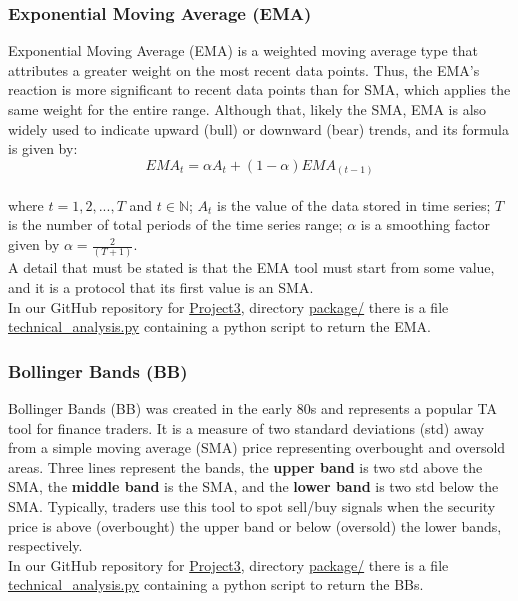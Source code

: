 \subsubsection{Exponential Moving Average (EMA)}
\label{chap:Exponential Moving Average (EMA)}

\quad Exponential Moving Average (EMA) is a weighted moving average type that attributes a greater weight on the most recent data points. Thus, the EMA's reaction is more significant to recent data points than for SMA, which applies the same weight for the entire range. Although that, likely the SMA, EMA is also widely used to indicate upward (bull) or downward (bear) trends, and its formula is given by:\\

$${EMA}_t = \alpha A_t + (1 - \alpha) EMA_{(t-1)}$$\\

\noindent where $t = 1, 2, ..., T$ and $t \in \mathbb{N}$; $A_t$ is the value of the data stored in time series; $T$ is the number of total periods of the time series range; $\alpha$ is a smoothing factor given by $\alpha = \frac{2}{(T+1)}$.\\

A detail that must be stated is that the EMA tool must start from some value, and it is a protocol that its first value is an SMA.\\

In our GitHub repository for \href{https://github.com/fabiorodp/UiO-FYS-STK4155/tree/master/Project3}{Project3}, directory \href{https://github.com/fabiorodp/UiO-FYS-STK4155/tree/master/Project3/package/}{package/} there is a file \href{https://github.com/fabiorodp/UiO-FYS-STK4155/tree/master/Project3/package/technical_analysis.py}{technical\_analysis.py} containing a python script to return the EMA.

\subsubsection{Bollinger Bands (BB)}
\label{chap:Bollinger Bands (BB)}

\quad Bollinger Bands (BB) was created in the early 80s and represents a popular TA tool for finance traders. It is a measure of two standard deviations (std) away from a simple moving average (SMA) price representing overbought and oversold areas. Three lines represent the bands, the \textbf{upper band} is two std above the SMA, the \textbf{middle band} is the SMA, and the \textbf{lower band} is two std below the SMA. Typically, traders use this tool to spot sell/buy signals when the security price is above (overbought) the upper band or below (oversold) the lower bands, respectively.\\

In our GitHub repository for \href{https://github.com/fabiorodp/UiO-FYS-STK4155/tree/master/Project3}{Project3}, directory \href{https://github.com/fabiorodp/UiO-FYS-STK4155/tree/master/Project3/package/}{package/} there is a file \href{https://github.com/fabiorodp/UiO-FYS-STK4155/tree/master/Project3/package/technical_analysis.py}{technical\_analysis.py} containing a python script to return the BBs.
